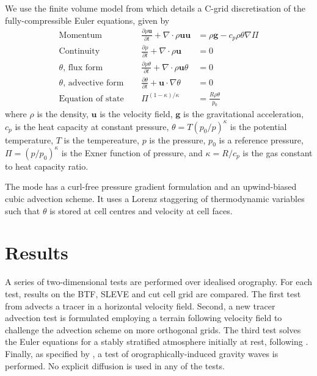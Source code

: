 \documentclass[twocol]{ametsoc}
\begin{document}
We use the finite volume model from \citet{weller-shahrokhi2014} which details a C-grid discretisation of the fully-compressible Euler equations, given by
\begin{subequations}
\begin{align}
	\text{Momentum} &\ &\  	\frac{\partial \rho \bm{u}}{\partial t} + \nabla \cdot \rho \bm{uu} &= \rho \bm{g} - c_p \rho \theta \nabla \Pi \label{eq:momentum} \\
	\text{Continuity} &\ &\	\frac{\partial \rho}{\partial t} + \nabla \cdot \rho \bm{u} &= 0 \\
	\text{$\theta$, flux form} &\ &\ \frac{\partial \rho \theta}{\partial t} + \nabla \cdot \rho \bm{u} \theta &= 0 \\
	\text{$\theta$, advective form} &\ &\ \frac{\partial \theta}{\partial t} + \bm{u} \cdot \nabla \theta &= 0 \\
	\text{Equation of state} &\ &\ \Pi^{(1 - \kappa)/\kappa} &= \frac{R \rho \theta}{p_0}
\end{align}
\end{subequations}
where \(\rho\) is the density, \(\bm{u}\) is the velocity field, \(\bm{g}\) is the gravitational acceleration, \(c_p\) is the heat capacity at constant pressure, \(\theta = T \left(p_0/p\right)^\kappa\) is the potential temperature, \(T\) is the tempereature, \(p\) is the pressure, \(p_0\) is a reference pressure, \(\Pi = \left(p / p_0 \right)^\kappa\) is the Exner function of pressure, and \(\kappa = R/c_p\) is the gas constant to heat capacity ratio.

The mode has a curl-free pressure gradient formulation and an upwind-biased cubic advection scheme.  It uses a Lorenz staggering of thermodynamic variables such that $\theta$ is stored at cell centres and velocity at cell faces.

\section{Results}
\label{sec:results}

A series of two-dimensional tests are performed over idealised orography.  For each test, results on the BTF, SLEVE and cut cell grid are compared.  The first test from \citet{schaer2002} advects a tracer in a horizontal velocity field.  Second, a new tracer advection test is formulated employing a terrain following velocity field to challenge the advection scheme on more orthogonal grids.  The third test solves the Euler equations for a stably stratified atmosphere initially at rest, following \citet{klemp2011}.  Finally, as specified by \citet{schaer2002}, a test of orographically-induced gravity waves is performed.  No explicit diffusion is used in any of the tests.
\end{document}
